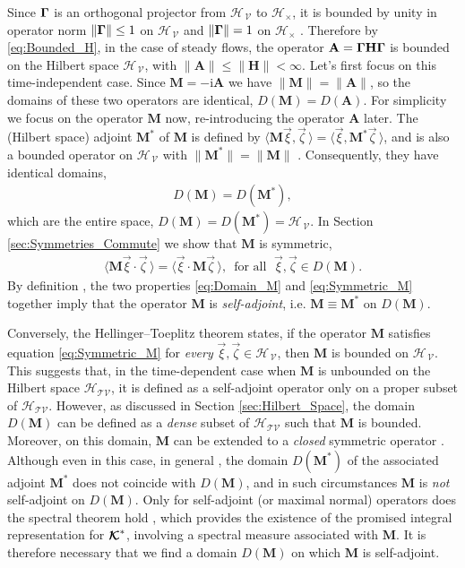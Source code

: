 \documentclass[11pt]{amsart}
\newcommand{\I}{\mathrm{i}}
\newcommand{\Mb}{\mathbf{M}}
\newcommand{\Hb}{\mathbf{H}}
\newcommand{\Ab}{\mathbf{A}}
\newcommand\Kbc{\mbox{\boldmath${\mathcal{K}}$}}
\newcommand{\Tc}{\mathcal{T}}
\newcommand{\Vc}{\mathcal{V}}
\newcommand{\Hs}{\mathscr{H}}
\newcommand\bGamma{\mbox{\boldmath${\Gamma}$}}
\begin{document}
Since $\bGamma$ is an orthogonal projector from $\Hs_{\,\Vc}$ to
$\Hs_\times$, it is bounded by unity in operator norm $\|\bGamma\|\leq1$ on
$\Hs_{\,\Vc}$ and $\|\bGamma\|=1$ on $\Hs_\times$
\cite{Reed-1980,Stone:64}. Therefore by \eqref{eq:Bounded_H}, in the
case of  steady flows, the operator $\Ab=\bGamma\Hb\bGamma$ is bounded
on the Hilbert space $\Hs_{\,\Vc}$, with $\|\Ab\|\leq\|\Hb\|<\infty$. Let's first
focus on this time-independent case. Since $\Mb=-\I\Ab$ we have 
$\|\Mb\|=\|\Ab\|$, so the domains of these two operators are identical,
$D(\Mb)=D(\Ab)$. For simplicity we focus on the operator $\Mb$ now,
re-introducing the operator $\Ab$ later. The (Hilbert space)
adjoint $\Mb^*$ of $\Mb$ is defined by
$\langle\Mb\vec{\xi},\vec{\zeta}\,\rangle=\langle\vec{\xi},\Mb^*\vec{\zeta}\,\rangle$, and is also a
bounded operator on $\Hs_{\,\Vc}$ with $\|\Mb^*\|=\|\Mb\|$
\cite{Reed-1980}. Consequently, they have identical domains,       
%
\begin{align}\label{eq:Domain_M}
  D(\Mb)=D(\Mb^*),
\end{align}
%
which are the entire space, $D(\Mb)=D(\Mb^*)=\Hs_{\,\Vc}$. In
Section \ref{sec:Symmetries_Commute} we show that $\Mb$ is symmetric,
%
\begin{align}\label{eq:Symmetric_M}
  \langle\Mb\vec{\xi}\cdot\vec{\zeta}\,\rangle=\langle\vec{\xi}\cdot\Mb\vec{\zeta}\,\rangle,
  \, \text{ for all } \; \vec{\xi},\vec{\zeta}\in D(\Mb).
\end{align}
%
By definition \cite{Reed-1980,Stone:64}, the two properties
\eqref{eq:Domain_M} and \eqref{eq:Symmetric_M} together imply that the
operator $\Mb$ is \emph{self-adjoint}, i.e. $\Mb\equiv\Mb^*$ on $D(\Mb)$.





Conversely, the Hellinger--Toeplitz theorem \cite{Reed-1980} states,
if the operator $\Mb$ satisfies equation \eqref{eq:Symmetric_M} for
\emph{every} $\vec{\xi},\vec{\zeta}\in\Hs_{\,\Vc}$, then $\Mb$ is
bounded on $\Hs_{\,\Vc}$. This suggests that, in the time-dependent
case when $\Mb$ is unbounded on the Hilbert space $\Hs_{\Tc\Vc}$, it
is defined as a self-adjoint operator only on a proper subset of
$\Hs_{\Tc\Vc}$. However, as discussed in 
Section \ref{sec:Hilbert_Space}, the domain $D(\Mb)$ can be defined as
a \emph{dense} subset of $\Hs_{\Tc\Vc}$ such that $\Mb$ is
bounded. Moreover, on this domain, $\Mb$ can be extended to a 
\emph{closed} symmetric operator \cite{Reed-1980,Stone:64}. Although
even in this case, in general \cite{Reed-1980}, the domain $D(\Mb^*)$
of the associated adjoint $\Mb^*$ does not coincide with $D(\Mb)$, and
in such circumstances $\Mb$ is \emph{not} self-adjoint on $D(\Mb)$. Only for
self-adjoint (or maximal normal) operators does the spectral theorem hold
\cite{Reed-1980}, which provides the existence of the promised
integral representation for $\Kbc^*$, involving a spectral measure
associated with $\Mb$. It is therefore necessary that we find a
domain $D(\Mb)$ on which $\Mb$ is self-adjoint.
\end{document}
